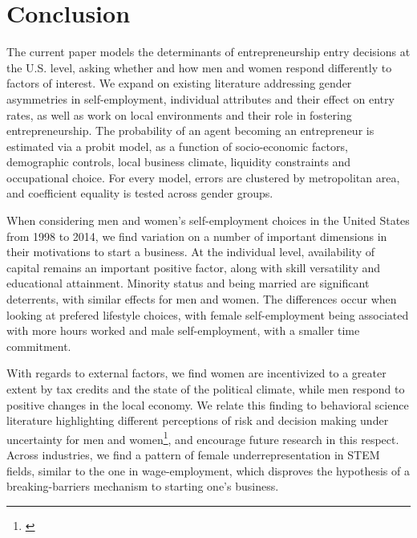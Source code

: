 
\chapter{Conclusion\label{ch:conclusion}}

The current paper models the determinants of entrepreneurship entry decisions at the U.S. level, asking whether and how men and women respond differently to factors of interest. We expand on existing literature addressing gender asymmetries in self-employment, individual attributes and their effect on entry rates, as well as work on local environments and their role in fostering entrepreneurship. The probability of an agent becoming an entrepreneur is estimated via a probit model, as a function of socio-economic factors, demographic controls, local business climate, liquidity constraints and occupational choice. For every model, errors are clustered by metropolitan area, and coefficient equality is tested across gender groups.

When considering men and women’s self-employment choices in the United States from 1998 to 2014, we find variation on a number of important dimensions in their motivations to start a business. At the individual level, availability of capital remains an important positive factor, along with skill versatility and educational attainment. Minority status and being married are significant deterrents, with similar effects for men and women. The differences occur when looking at prefered lifestyle choices, with female self-employment being associated with more hours worked and male self-employment, with a smaller time commitment. 

With regards to external factors, we find women are incentivized to a greater extent by tax credits and the state of the political climate, while men respond to positive changes in the local economy. We relate this finding to behavioral science literature highlighting different perceptions of risk and decision making under uncertainty for men and women\footnote{\cite{adams2012beyond}\cite{koellinger2013gender}}, and encourage future research in this respect. Across industries, we find a pattern of female underrepresentation in STEM fields, similar to the one in wage-employment, which disproves the hypothesis of a breaking-barriers mechanism to starting one's business. 

